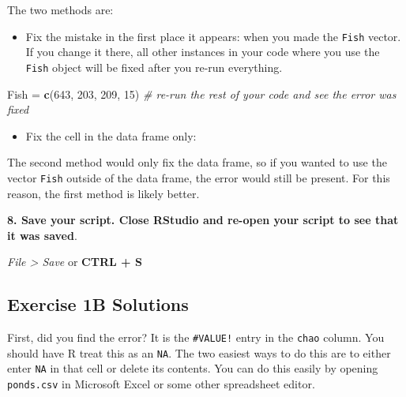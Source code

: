 \documentclass[]{book}
\newenvironment{Shaded}{\begin{snugshade}}{\end{snugshade}}
\newcommand{\CommentTok}[1]{\textcolor[rgb]{0.56,0.35,0.01}{\textit{#1}}}
\newcommand{\DecValTok}[1]{\textcolor[rgb]{0.00,0.00,0.81}{#1}}
\newcommand{\KeywordTok}[1]{\textcolor[rgb]{0.13,0.29,0.53}{\textbf{#1}}}
\newcommand{\NormalTok}[1]{#1}
\newcommand{\OperatorTok}[1]{\textcolor[rgb]{0.81,0.36,0.00}{\textbf{#1}}}
\newcommand{\StringTok}[1]{\textcolor[rgb]{0.31,0.60,0.02}{#1}}
\providecommand{\tightlist}{%
  \setlength{\itemsep}{0pt}\setlength{\parskip}{0pt}}
\begin{document}
The two methods are:

\begin{itemize}
\tightlist
\item
  Fix the mistake in the first place it appears: when you made the \texttt{Fish} vector. If you change it there, all other instances in your code where you use the \texttt{Fish} object will be fixed after you re-run everything.
\end{itemize}

\begin{Shaded}
\begin{Highlighting}[]
\NormalTok{Fish =}\StringTok{ }\KeywordTok{c}\NormalTok{(}\DecValTok{643}\NormalTok{, }\DecValTok{203}\NormalTok{, }\DecValTok{209}\NormalTok{, }\DecValTok{15}\NormalTok{)}
\CommentTok{# re-run the rest of your code and see the error was fixed}
\end{Highlighting}
\end{Shaded}

\begin{itemize}
\tightlist
\item
  Fix the cell in the data frame only:
\end{itemize}

\begin{Shaded}
\end{Shaded}

The second method would only fix the data frame, so if you wanted to use the vector \texttt{Fish} outside of the data frame, the error would still be present. For this reason, the first method is likely better.

\textbf{8. Save your script. Close RStudio and re-open your script to see that it was saved}.

\emph{File \textgreater{} Save} or \textbf{CTRL + S}

\hypertarget{ex1b-answers}{%
\subsection*{Exercise 1B Solutions}\label{ex1b-answers}}

First, did you find the error? It is the \texttt{\#VALUE!} entry in the \texttt{chao} column. You should have R treat this as an \texttt{NA}. The two easiest ways to do this are to either enter \texttt{NA} in that cell or delete its contents. You can do this easily by opening \texttt{ponds.csv} in Microsoft Excel or some other spreadsheet editor.
\end{document}
